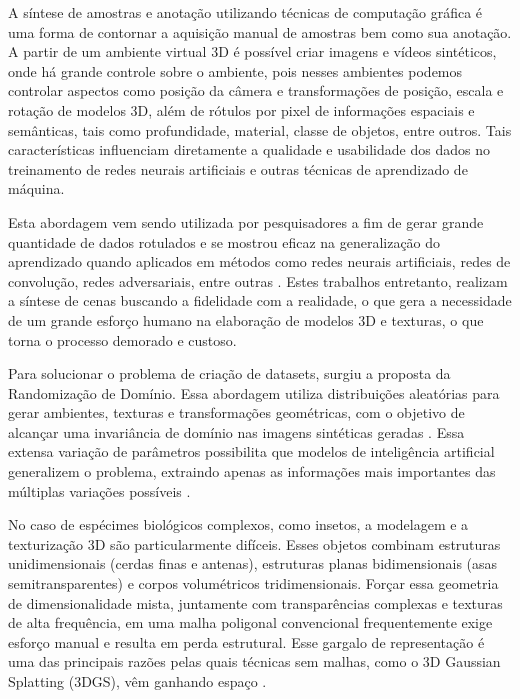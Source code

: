\documentclass[a4paper,12pt]{article}
\begin{document}
{A síntese de amostras e anotação utilizando técnicas de computação gráfica é uma forma de contornar a aquisição manual de amostras bem como sua anotação. A partir de um ambiente virtual 3D é possível criar imagens e vídeos sintéticos, onde há grande controle sobre o ambiente, pois nesses ambientes podemos controlar aspectos como posição da câmera e transformações de posição, escala e rotação de modelos 3D, além de rótulos por pixel de informações espaciais e semânticas, tais como profundidade, material, classe de objetos, entre outros. Tais características influenciam diretamente a qualidade e usabilidade dos dados no treinamento de redes neurais artificiais e outras técnicas de aprendizado de máquina.

Esta abordagem vem sendo utilizada por pesquisadores a fim de gerar grande quantidade de dados rotulados e se mostrou eficaz na generalização do aprendizado quando aplicados em métodos como redes neurais artificiais, redes de convolução, redes adversariais, entre outras \cite{Roberts_2021_ICCV, ros2016synthia, tremblay2018falling, Varol_2017_CVPR}. Estes trabalhos entretanto, realizam a síntese de cenas buscando a fidelidade com a realidade, o que gera a necessidade de um grande esforço humano na elaboração de modelos 3D e texturas, o que torna o processo demorado e custoso.

Para solucionar o problema de criação de datasets, surgiu a proposta da Randomização de Domínio. Essa abordagem utiliza distribuições aleatórias para gerar ambientes, texturas e transformações geométricas, com o objetivo de alcançar uma invariância de domínio nas imagens sintéticas geradas \cite{yue2019domain}. Essa extensa variação de parâmetros possibilita que modelos de inteligência artificial generalizem o problema, extraindo apenas as informações mais importantes das múltiplas variações possíveis \cite{Loquercio_2020}.

No caso de espécimes biológicos complexos, como insetos, a modelagem e a texturização 3D são particularmente difíceis. Esses objetos combinam estruturas unidimensionais (cerdas finas e antenas), estruturas planas bidimensionais (asas semitransparentes) e corpos volumétricos tridimensionais. Forçar essa geometria de dimensionalidade mista, juntamente com transparências complexas e texturas de alta frequência, em uma malha poligonal convencional frequentemente exige esforço manual e resulta em perda estrutural. Esse gargalo de representação é uma das principais razões pelas quais técnicas sem malhas, como o 3D Gaussian Splatting (3DGS), vêm ganhando espaço \cite{kerbl20233d}.

}
\end{document}
